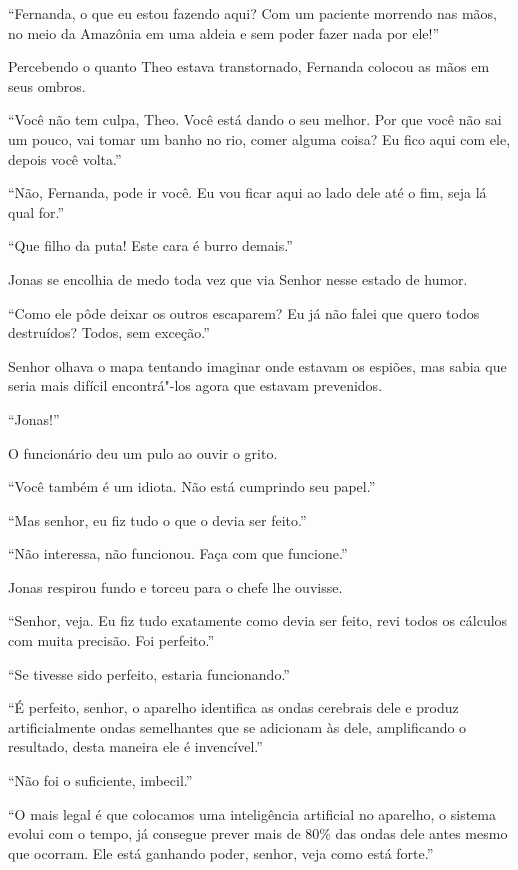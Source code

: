 ``Fernanda, o que eu estou fazendo aqui? Com um paciente morrendo nas
mãos, no meio da Amazônia em uma aldeia e sem poder fazer nada por
ele!''

Percebendo o quanto Theo estava transtornado, Fernanda colocou as mãos
em seus ombros.

``Você não tem culpa, Theo. Você está dando o seu melhor. Por que você
não sai um pouco, vai tomar um banho no rio, comer alguma coisa? Eu fico
aqui com ele, depois você volta.''

``Não, Fernanda, pode ir você. Eu vou ficar aqui ao lado dele até o fim,
seja lá qual for.''

\asterisc


``Que filho da puta! Este cara é burro demais.''

Jonas se encolhia de medo toda vez que via Senhor  nesse estado de
humor.

``Como ele pôde deixar os outros escaparem? Eu já não falei que quero
todos destruídos? Todos, sem exceção.''

Senhor  olhava o mapa tentando imaginar onde estavam os espiões, mas
sabia que seria mais difícil encontrá"-los agora que estavam prevenidos.

``Jonas!''

O funcionário deu um pulo ao ouvir o grito.

``Você também é um idiota. Não está cumprindo seu papel.''

``Mas senhor, eu fiz tudo o que o devia ser feito.''

``Não interessa, não funcionou. Faça com que funcione.''

Jonas respirou fundo e torceu para o chefe lhe ouvisse.

``Senhor, veja. Eu fiz tudo exatamente como devia ser feito, revi todos
os cálculos com muita precisão. Foi perfeito.''

``Se tivesse sido perfeito, estaria funcionando.''

``É perfeito, senhor, o aparelho identifica as ondas cerebrais dele e
produz artificialmente ondas semelhantes que se adicionam às dele,
amplificando o resultado, desta maneira ele é invencível.''

``Não foi o suficiente, imbecil.''

``O mais legal é que colocamos uma inteligência artificial no aparelho, o
sistema evolui com o tempo, já consegue prever mais de 80\% das ondas
dele antes mesmo que ocorram. Ele está ganhando poder, senhor, veja como
está forte.''

